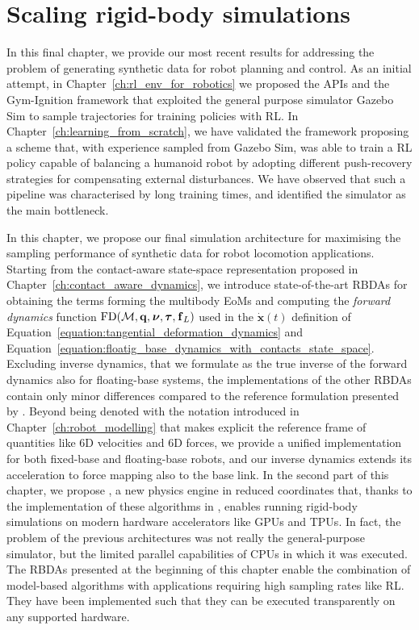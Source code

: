 \acresetall
\chapter{Scaling rigid-body simulations}
\label{ch:scaling_rigid_body_simulations}

In this final chapter, we provide our most recent results for addressing the problem of generating synthetic data for robot planning and control.
As an initial attempt, in Chapter~\ref{ch:rl_env_for_robotics} we proposed the \scenario \acp{API} and the Gym-Ignition framework that exploited the general purpose simulator Gazebo Sim to sample trajectories for training policies with \ac{RL}.
In Chapter~\ref{ch:learning_from_scratch}, we have validated the framework proposing a scheme that, with experience sampled from Gazebo Sim, was able to train a \ac{RL} policy capable of balancing a humanoid robot by adopting different push-recovery strategies for compensating external disturbances.
We have observed that such a pipeline was characterised by long training times, and identified the simulator as the main bottleneck.

In this chapter, we propose our final simulation architecture for maximising the sampling performance of synthetic data for robot locomotion applications.
Starting from the contact-aware state-space representation proposed in Chapter~\ref{ch:contact_aware_dynamics}, we introduce state-of-the-art \acp{RBDA} for obtaining the terms forming the multibody \acp{EoM} and computing the \emph{forward dynamics} function $\operatorname{FD}(\mathcal{M}, \mathbf{q}, \prescript{}{}{\boldsymbol{\nu}}, \boldsymbol{\tau}, \prescript{}{}{\mathbf{f}}_L)$ used in the  $\dot{\mathbf{x}}(t)$ definition of Equation~\ref{equation:tangential_deformation_dynamics} and Equation~\ref{equation:floatig_base_dynamics_with_contacts_state_space}.
Excluding inverse dynamics, that we formulate as the true inverse of the forward dynamics also for floating-base systems, the implementations of the other \acp{RBDA} contain only minor differences compared to the reference formulation presented by \textcite{featherstone_rigid_2008}.
Beyond being denoted with the notation introduced in Chapter~\ref{ch:robot_modelling} that makes explicit the reference frame of quantities like 6D velocities and 6D forces, we provide a unified implementation for both fixed-base and floating-base robots, and our inverse dynamics extends its acceleration to force mapping also to the base link.
In the second part of this chapter, we propose  \jaxsim, a new physics engine in reduced coordinates that, thanks to the implementation of these algorithms in \jax, enables running rigid-body simulations on modern hardware accelerators like \acsp{GPU} and \acsp{TPU}.
In fact, the problem of the previous architectures was not really the general-purpose simulator, but the limited parallel capabilities of \acsp{CPU} in which it was executed.
The \acp{RBDA} presented at the beginning of this chapter enable the combination of model-based algorithms with applications requiring high sampling rates like \acs{RL}.
They have been implemented such that they can be executed transparently on any supported hardware.

